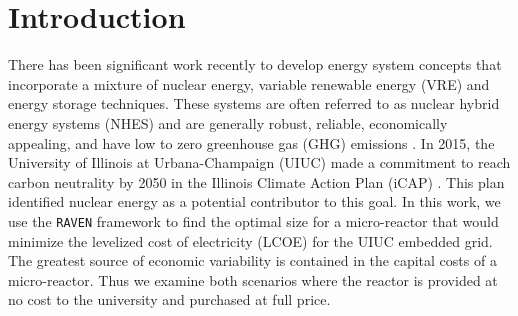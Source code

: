 \section{Introduction}

There has been significant work recently to develop energy system concepts that incorporate a mixture of nuclear energy, variable renewable energy (VRE) and energy storage techniques.
These systems are often referred to as nuclear hybrid energy systems (NHES) and are generally robust, reliable, economically appealing, and have low to zero greenhouse gas (GHG) emissions \cite{baker_optimal_2018,ruth_nuclear-renewable_2014,ruth_economic_2016,suman_hybrid_2018-1}.
In 2015, the University of Illinois at Urbana-Champaign (UIUC) made a commitment to reach carbon neutrality by 2050 in the Illinois Climate Action Plan (iCAP) \cite{isee_illinois_2015}.
This plan identified nuclear energy as a potential contributor to this goal.
In this work, we use the \texttt{RAVEN} framework to find the optimal size for a micro-reactor that would minimize the levelized cost of electricity (LCOE) for the UIUC embedded grid.
The greatest source of economic variability is contained in the capital costs of a micro-reactor. Thus we examine both scenarios where the reactor is provided at no cost to the university and purchased at full price.
